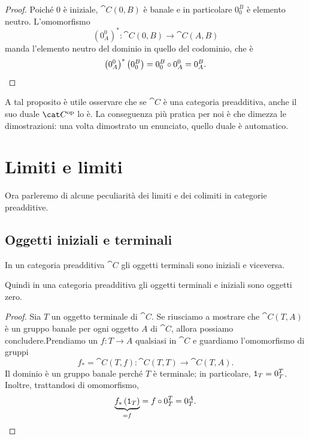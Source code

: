 \begin{proof}
  Poiché \(0\) è iniziale, \(\cat C(0, B)\) è banale e in particolare
  \(0_0^B\) è elemento neutro. L'omomorfismo
  \[
    \left(0_A^0\right)^\ast : \cat C(0, B) \to \cat C(A, B)
  \]
  manda l'elemento neutro del dominio in quello del codominio, che è
  \[
    \left(0_A^0\right)^\ast\left(0_0^B\right) = 0_0^B \circ 0_A^0 = 0_A^B
    . \qedhere
  \]
\end{proof}

\begin{remark}
  A tal proposito è utile osservare che se \(\cat C\) è una categoria
  preadditiva, anche il suo duale \(\opcat C\) lo è. La conseguenza più
  pratica per noi è che dimezza le dimostrazioni: una volta dimostrato
  un enunciato, quello duale è automatico.
\end{remark}



\section{Limiti e limiti}

Ora parleremo di alcune peculiarità dei limiti e dei colimiti in
categorie preadditive.


\subsection{Oggetti iniziali e terminali}

\begin{proposition}
  In un categoria preadditiva \(\cat C\) gli oggetti terminali sono
  iniziali e viceversa.
\end{proposition}

Quindi in una categoria preadditiva gli oggetti terminali e iniziali
sono oggetti zero.

\begin{proof}
  Sia \(T\) un oggetto terminale di \(\cat C\). Se riusciamo a mostrare
  che \(\cat C(T, A)\) è un gruppo banale per ogni oggetto \(A\) di
  \(\cat C\), allora possiamo concludere.\newline Prendiamo un
  \(f : T \to A\) qualsiasi in \(\cat C\) e guardiamo l'omomorfismo di
  gruppi
  \[
    f_\ast = \cat C(T, f) : \cat C(T, T) \to \cat C(T, A) .
  \]
  Il dominio è un gruppo banale perché \(T\) è terminale; in
  particolare, \(\mathtt 1_T = 0_T^T\). Inoltre, trattandosi di omomorfismo,
  \[
    \underbrace{f_\ast \left(\id_T\right)}_{= f} = f \circ 0_T^T = 0_T^A
    . \qedhere
  \]
\end{proof}


